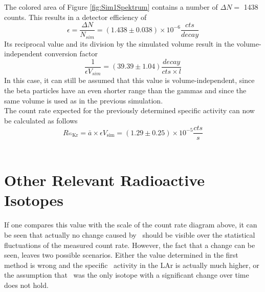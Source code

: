 \documentclass[encoding=utf8,british]{tumphthesis}
\begin{document}
The colored area of Figure \ref{fig:Sim1Spektrum} contains a number of $\Delta N =$ 1438 counts.
This results in a detector efficiency of 
\begin{equation*}
\epsilon = \frac{\Delta N}{N_{\unit{sim}}} = (1.438 \pm 0.038) \times 10^{-6} \frac{\unit{cts}}{\unit{decay}}
\end{equation*}
Its reciprocal value and its division by the simulated volume result in the volume-independent conversion factor
\begin{equation*}
\frac{1}{\epsilon V_{\unit{sim}}} = (39.39 \pm 1.04) \frac{\unit{decay}}{\unit{cts \times l}}
\end{equation*}
In this case, it can still be assumed that this value is volume-independent, since the beta particles have an even shorter range than the gammas and since the same volume is used as in the previous simulation.
\\

The count rate expected for the previously determined specific activity can now be calculated as follows
\begin{equation*}
R_{^{85}\mathrm{Kr}} = \bar{a} \times  \epsilon V_{\mathrm{sim}} =  (1.29\pm0.25) \times 10^{-5} \frac{\unit{cts}}{\unit{s}}
\end{equation*}
\\

\section{Other Relevant Radioactive Isotopes}
\label{sec:other}

If one compares this value with the scale of the count rate diagram above, it can be seen that actually no change caused by \Kr\ should be visible over the statistical fluctuations of the measured count rate.
However, the fact that a change can be seen, leaves two possible scenarios.
Either the value determined in the first method is wrong and the specific \Kr\ activity in the LAr is actually much higher, or the assumption that \Kr\ was the only isotope with a significant change over time does not hold.
\\
\end{document}
